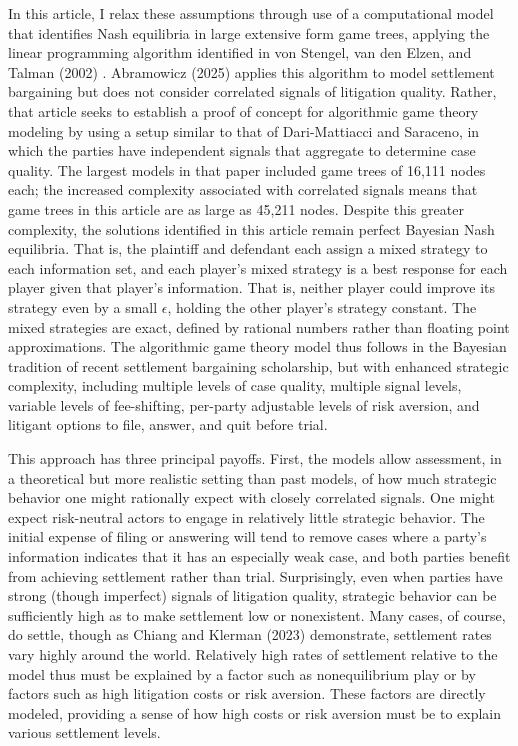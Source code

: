 \documentclass{article}
\begin{document}
In this article, I relax these assumptions through use of a computational model that identifies Nash equilibria in large extensive form game trees, applying the linear programming algorithm identified in von Stengel, van den Elzen, and Talman (2002) \cite{vonstengelvandenelzentalman}. Abramowicz (2025) applies this algorithm to model settlement bargaining but does not consider correlated signals of litigation quality. Rather, that article seeks to establish a proof of concept for algorithmic game theory modeling by using a setup similar to that of Dari-Mattiacci and Saraceno, in which the parties have independent signals that aggregate to determine case quality. The largest models in that paper included game trees of 16,111 nodes each; the increased complexity associated with correlated signals means that game trees in this article are as large as 45,211 nodes. Despite this greater complexity, the solutions identified in this article remain perfect Bayesian Nash equilibria. That is, the plaintiff and defendant each assign a mixed strategy to each information set, and each player's mixed strategy is a best response for each player given that player's information. That is, neither player could improve its strategy even by a small $\epsilon$, holding the other player's strategy constant. The mixed strategies are exact, defined by rational numbers rather than floating point approximations. The algorithmic game theory model thus follows in the Bayesian tradition of recent settlement bargaining scholarship, but with enhanced strategic complexity, including multiple levels of case quality, multiple signal levels, variable levels of fee-shifting, per-party adjustable levels of risk aversion, and litigant options to file, answer, and quit before trial. 

This approach has three principal payoffs. First, the models allow assessment, in a theoretical but more realistic setting than past models, of how much strategic behavior one might rationally expect with closely correlated signals. One might expect risk-neutral actors to engage in relatively little strategic behavior. The initial expense of filing or answering will tend to remove cases where a party's information indicates that it has an especially weak case, and both parties benefit from achieving settlement rather than trial. Surprisingly, even when parties have strong (though imperfect) signals of litigation quality, strategic behavior can be sufficiently high as to make settlement low or nonexistent. Many cases, of course, do settle, though as Chiang and Klerman (2023) \cite{changklerman} demonstrate, settlement rates vary highly around the world. Relatively high rates of settlement relative to the model thus must be explained by a factor such as nonequilibrium play or by factors such as high litigation costs or risk aversion. These factors are directly modeled, providing a sense of how high costs or risk aversion must be to explain various settlement levels.
\end{document}
